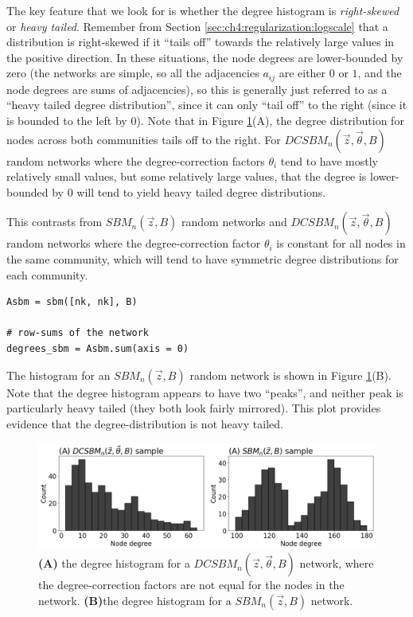 The key feature that we look for is whether the degree histogram is \textit{right-skewed} or \textit{heavy tailed}. Remember from Section \ref{sec:ch4:regularization:logscale} that a distribution is right-skewed if it ``tails off'' towards the relatively large values in the positive direction. In these situations, the node degrees are lower-bounded by zero (the networks are simple, so all the adjacencies $a_{ij}$ are either $0$ or $1$, and the node degrees are sums of adjacencies), so this is generally just referred to as a ``heavy tailed degree distribution'', since it can only ``tail off'' to the right (since it is bounded to the left by $0$). Note that in Figure \ref{fig:ch6:lse:degree}(A), the degree distribution for nodes across both communities tails off to the right. For $DCSBM_n(\vec z, \vec \theta, B)$ random networks where the degree-correction factors $\theta_i$ tend to have mostly relatively small values, but some relatively large values, that the degree is lower-bounded by $0$ will tend to yield heavy tailed degree distributions. 

This contrasts from $SBM_n(\vec z, B)$ random networks and $DCSBM_n(\vec z, \vec \theta, B)$ random networks where the degree-correction factor $\theta_i$ is constant for all nodes in the same community, which will tend to have symmetric degree distributions for each community.

\begin{lstlisting}[style=python]
Asbm = sbm([nk, nk], B)

# row-sums of the network
degrees_sbm = Asbm.sum(axis = 0)
\end{lstlisting}

The histogram for an $SBM_n(\vec z, B)$ random network is shown in Figure \ref{fig:ch6:lse:degree}(B). Note that the degree histogram appears to have two ``peaks'', and neither peak is particularly heavy tailed (they both look fairly mirrored). This plot provides evidence that the degree-distribution is not heavy tailed.

\begin{figure}[h]
    \centering
    \includegraphics[width=\linewidth]{representations/ch6/Images/lse_degree.png}
    \caption[degree histogram for $DCSBM_n(\vec z, \vec \theta, B)$]{\textbf{(A)} the degree histogram for a $DCSBM_n(\vec z, \vec \theta, B)$ network, where the degree-correction factors are not equal for the nodes in the network. \textbf{(B)}the degree histogram for a $SBM_n(\vec z, B)$ network.}
    \label{fig:ch6:lse:degree}
\end{figure}

